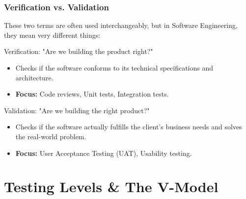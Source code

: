 \documentclass[xcolor=table]{beamer}
\begin{document}
\begin{frame}
    \frametitle{Verification vs. Validation}
    \small
    These two terms are often used interchangeably, but in Software Engineering, they mean very different things:
    
    \begin{block}{Verification: "Are we building the product right?"}
        \begin{itemize}
            \item Checks if the software conforms to its technical specifications and architecture.
            \item \textbf{Focus:} Code reviews, Unit tests, Integration tests.
        \end{itemize}
    \end{block}
    
    \begin{block}{Validation: "Are we building the right product?"}
        \begin{itemize}
            \item Checks if the software actually fulfills the client's business needs and solves the real-world problem.
            \item \textbf{Focus:} User Acceptance Testing (UAT), Usability testing.
        \end{itemize}
    \end{block}
\end{frame}

\section{Testing Levels \& The V-Model}
\end{document}
